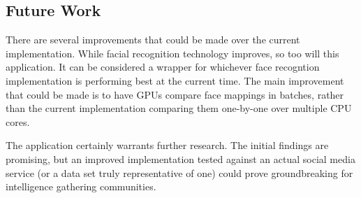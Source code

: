 \documentclass[12pt]{article}
\begin{document}
\subsection{Future Work}
There are several improvements that could be made over the current implementation. While facial recognition technology improves, so too will this application. It can be considered a wrapper for whichever face recogntion implementation is performing best at the current time. The main improvement that could be made is to have GPUs compare face mappings in batches, rather than the current implementation comparing them one-by-one over multiple CPU cores.

The application certainly warrants further research. The initial findings are promising, but an improved implementation tested against an actual social media service (or a data set truly representative of one) could prove groundbreaking for intelligence gathering communities.

\newpage

\end{document}
